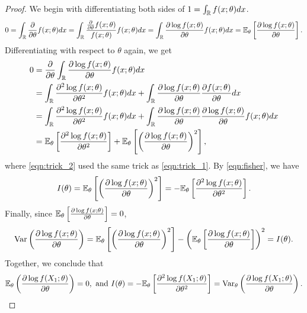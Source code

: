 \begin{proof}
We begin with differentiating both sides of $1 = \int_{\mathbb{R}} f(x;\theta) dx$.
\begin{align}
0 = \int_{\mathbb{R}} \frac{\partial}{\partial\theta} f(x;\theta)dx
= \int_{\mathbb{R}} \frac{\frac{\partial}{\partial\theta} f(x;\theta)}{f(x;\theta)}f(x;\theta) dx
= \int_{\mathbb{R}} \frac{\partial \log f(x;\theta)}{\partial\theta}f(x;\theta) dx 
= \mathbb{E}_\theta\left[ \frac{\partial \log f(x;\theta)}{\partial\theta} \right]. \label{eqn:trick_1}
\end{align}
Differentiating with respect to $\theta$ again, we get
\begin{align}
0 &= \frac{\partial}{\partial\theta}\int_{\mathbb{R}} \frac{\partial \log f(x;\theta)}{\partial\theta}f(x;\theta) dx\nonumber\\
&= \int_{\mathbb{R}} \frac{\partial^2 \log f(x;\theta)}{\partial\theta^2}f(x;\theta) dx + \int_{\mathbb{R}} \frac{\partial \log f(x;\theta)}{\partial\theta}\frac{\partial f(x;\theta)}{\partial\theta} dx\nonumber\\
&= \int_{\mathbb{R}} \frac{\partial^2 \log f(x;\theta)}{\partial\theta^2}f(x;\theta) dx + \int_{\mathbb{R}} \frac{\partial \log f(x;\theta)}{\partial\theta}\frac{\partial \log f(x;\theta)}{\partial\theta}f(x;\theta) dx \label{eqn:trick_2} \\
&= \mathbb{E}_\theta\left[ \frac{\partial^2 \log f(x;\theta)}{\partial\theta^2} \right] + \mathbb{E}_\theta\left[ \left(\frac{\partial \log f(x;\theta)}{\partial\theta}\right)^2 \right],\nonumber
\end{align}
where \cref{eqn:trick_2} used the same trick as \cref{eqn:trick_1}. By \cref{eqn:fisher}, we have
\begin{align*}
I(\theta) = \mathbb{E}_\theta\left[ \left(\frac{\partial \log f(x;\theta)}{\partial\theta}\right)^2 \right] = -\mathbb{E}_\theta\left[ \frac{\partial^2 \log f(x;\theta)}{\partial\theta^2} \right].
\end{align*}
Finally, since $\mathbb{E}_\theta\left[ \frac{\partial \log f(x;\theta)}{\partial\theta} \right] = 0$,
\begin{align*}
\text{Var}\left( \frac{\partial \log f(x;\theta)}{\partial\theta} \right) = \mathbb{E}_\theta\left[ \left(\frac{\partial \log f(x;\theta)}{\partial\theta}\right)^2 \right] - \left( \mathbb{E}_\theta\left[ \frac{\partial \log f(x;\theta)}{\partial\theta} \right] \right)^2 = I(\theta).
\end{align*}
Together, we conclude that
\begin{align*}
\mathbb{E}_\theta\left( \frac{\partial\log f(X_1;\theta)}{\partial \theta} \right) = 0, \text{ and }
I(\theta) = -\mathbb{E}_\theta\left[ \frac{\partial^2\log f(X_1;\theta)}{\partial \theta^2} \right] = \text{Var}_\theta\left( \frac{\partial\log f(X_1;\theta)}{\partial \theta} \right).
\end{align*}
\end{proof}
